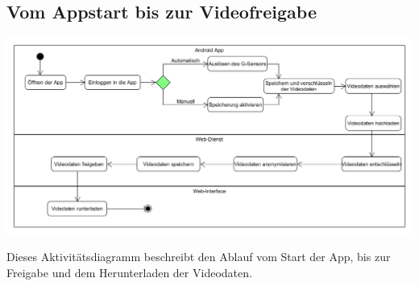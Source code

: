 \subsection{Vom Appstart bis zur Videofreigabe}
\begin{center}
\includegraphics[width=1\textwidth]{subtopicsFuncspec/Res/systemModels/AKDiagramm.png}
\end{center}
Dieses Aktivitätsdiagramm beschreibt den Ablauf vom Start der \gls{App}, bis zur Freigabe und dem Herunterladen der Videodaten. 
